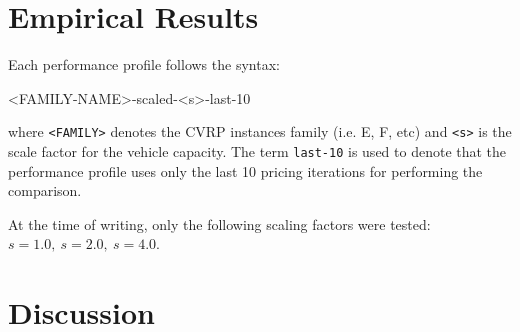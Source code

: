 \begin{comment}
In this thesis, we will use performance profiles extensively to measure each solver by exploiting two performance metrics: \textbf{Time metric}, \textbf{Cost metric}.

A \textbf{Time performance profile} will tell us which resolution method is the fastest in terms of runtime.
A \textbf{Cost performance profile}, instead, will show us the cost ratio of the best upper bound obtained from each resolution method.
The ground truth optimal, as extracted from the dataset, is used instead as the cost baseline.
\end{comment}

\section{Empirical Results}
\label{sec:results-empirical-results}






Each performance profile follows the syntax:
\begin{center}
	\begin{LVerbatim}
		<FAMILY-NAME>-scaled-<s>-last-10
	\end{LVerbatim}
\end{center}
where \texttt{<FAMILY>} denotes the CVRP instances family (i.e. E, F, etc) and \texttt{<s>} is the scale factor for the vehicle capacity.
The term \texttt{last-10} is used to denote that the performance profile uses only the last 10 pricing iterations for performing the comparison.

At the time of writing, only the following scaling factors were tested: $s = 1.0,\ s = 2.0,\ s = 4.0$.

\section{Discussion}
\label{sec:results-discussion}


\begin{comment}
\mytodo{Include the F-n135 grep result to talk about the difficulty of this instance and related ones}
\end{comment}

